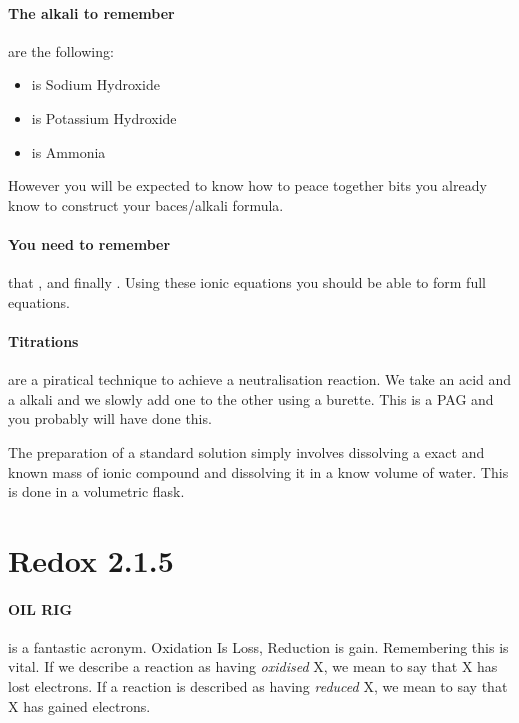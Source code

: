 \documentclass[11pt,a4paper]{memoir}
\begin{document}
	\paragraph{The alkali to remember} are the following:
	\begin{itemize}
		\item {} is Sodium Hydroxide
		\item {} is Potassium Hydroxide
		\item {} is Ammonia
	\end{itemize}
	However you will be expected to know how to peace together bits you already know to construct your baces/alkali formula.
	
	\paragraph{You need to remember} that ,  and finally . Using these ionic equations you should be able to form full equations.
	
	\paragraph{Titrations} are a piratical technique to achieve a neutralisation reaction. We take an acid and a alkali and we slowly add one to the other using a burette. This is a PAG and you probably will have done this.
	
	The preparation of a standard solution simply involves dissolving a exact and known mass of ionic compound and dissolving it in a know volume of water. This is done in a volumetric flask.
	
\section{Redox 2.1.5}

	\paragraph{OIL RIG} is a fantastic acronym. Oxidation Is Loss, Reduction is gain. Remembering this is vital. If we describe a reaction as having \textit{oxidised} X, we mean to say that X has lost electrons. If a reaction is described as having \textit{reduced} X, we mean to say that X has gained electrons.
	
\end{document}
